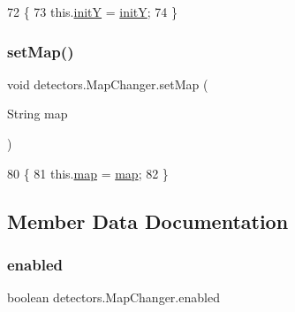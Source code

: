 \begin{DoxyCode}
72                                     \{
73         this.\mbox{\hyperlink{classdetectors_1_1_map_changer_a893e5aefb0e75665409f73b6e1542b59}{initY}} = \mbox{\hyperlink{classdetectors_1_1_map_changer_a893e5aefb0e75665409f73b6e1542b59}{initY}};
74     \}
\end{DoxyCode}
\mbox{\label{classdetectors_1_1_map_changer_ae894dd5e58b9f82acefbfc85a928ecb6}} 
\subsubsection{\texorpdfstring{set\+Map()}{setMap()}}
{\footnotesize\ttfamily void detectors.\+Map\+Changer.\+set\+Map (\begin{DoxyParamCaption}\item[{String}]{map }\end{DoxyParamCaption})\hspace{0.3cm}{\ttfamily [inline]}}


\begin{DoxyCode}
80                                    \{
81         this.\mbox{\hyperlink{classdetectors_1_1_map_changer_ad642fa774f24afd2651f54d430608092}{map}} = \mbox{\hyperlink{classdetectors_1_1_map_changer_ad642fa774f24afd2651f54d430608092}{map}};
82     \}
\end{DoxyCode}


\subsection{Member Data Documentation}
\mbox{\label{classdetectors_1_1_map_changer_a603d3a106676167a607d9acd5176f8f8}} 
\subsubsection{\texorpdfstring{enabled}{enabled}}
{\footnotesize\ttfamily boolean detectors.\+Map\+Changer.\+enabled\hspace{0.3cm}{\ttfamily [private]}}

